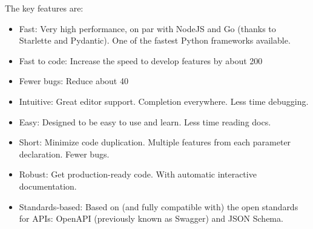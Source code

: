 The key features are:
\begin{itemize}
\item Fast: Very high performance, on par with NodeJS and Go (thanks to Starlette and Pydantic). One of the fastest Python frameworks available.

\item Fast to code: Increase the speed to develop features by about 200%

\item Fewer bugs: Reduce about 40%
\item Intuitive: Great editor support. Completion everywhere. Less time debugging.
\item Easy: Designed to be easy to use and learn. Less time reading docs.
\item Short: Minimize code duplication. Multiple features from each parameter declaration. Fewer bugs.
\item Robust: Get production-ready code. With automatic interactive documentation.
\item Standards-based: Based on (and fully compatible with) the open standards for APIs: OpenAPI (previously known as Swagger) and JSON Schema. \cite{WhatIsFastAPI}
\end{itemize} 

